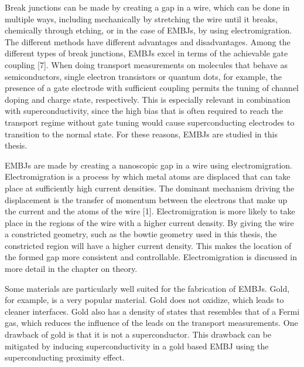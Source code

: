 Break junctions can be made by creating a gap in a wire, which can be done in multiple ways, including mechanically by stretching the wire until it breaks, chemically through etching, or in the case of EMBJs, by using electromigration. The different methods have different advantages and disadvantages. Among the different types of break junctions, EMBJs excel in terms of the achievable gate coupling [7]. When doing transport measurements    on molecules that behave as semiconductors, single electron transistors or quantum dots, for example, the presence of a gate electrode with sufficient coupling permits the tuning of channel doping and charge state, respectively. This is especially relevant in combination with superconductivity, since the high bias that is often required to reach the transport regime without gate tuning would cause superconducting electrodes to transition to the normal state. For these reasons, EMBJs are studied in this thesis.

EMBJs are made by creating a nanoscopic gap in a wire using electromigration. Electromigration is a process by which metal atoms are displaced that can take place at sufficiently high current densities. The dominant mechanism driving the displacement is the transfer of momentum between the electrons that make up the current and the atoms of the wire [1]. Electromigration is more likely to take place in the regions of the wire with a higher current density. By giving the wire a constricted geometry, such as the bowtie geometry used in this thesis, the constricted region will have a higher current density. This makes the location of the formed gap more consistent and controllable.  Electromigration is discussed in more detail in the chapter on theory.

Some materials are particularly well suited for the fabrication of EMBJs. Gold, for example, is a very popular material. Gold does not oxidize, which leads to cleaner interfaces. Gold also has a density of states that resembles that of a Fermi gas, which reduces the influence of the leads on the transport measurements. One drawback of gold is that it is not a superconductor. This drawback can be mitigated by inducing superconductivity in a gold based EMBJ using the superconducting proximity effect.

